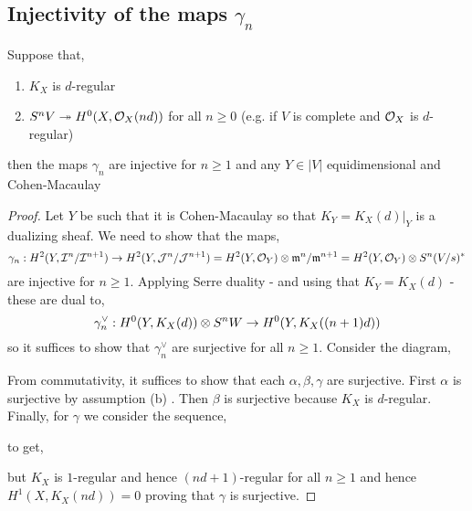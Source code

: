 \documentclass[12pt]{article}
\begin{document}
\subsection{Injectivity of the maps $\gamma_n$}

\begin{prop} \label{prop:injectivity}
Suppose that,
\begin{enumerate}
\item $K_X$ is $d$-regular
\item $S^n V \twoheadrightarrow H^0(X, \mathcal{O}_{X}(nd))$ for all $n \ge 0$ (e.g. if $V$ is complete and $\mathcal{O}_{X}$ is $d$-regular)
\end{enumerate}
then the maps $\gamma_n$ are injective for $n \ge 1$ and any $Y \in |V|$ equidimensional and Cohen-Macaulay
\end{prop}

\begin{proof}
Let $Y$ be such that it is Cohen-Macaulay so that $K_Y = K_X(d)|_Y$ is a dualizing sheaf.
We need to show that the maps,
\[ \gamma_n : H^2(Y, \mathcal{I}^n / \mathcal{I}^{n+1}) \to H^2(Y, \mathcal{J}^n / \mathcal{J}^{n+1}) = H^2(Y, \mathcal{O}_{Y}) \otimes \mathfrak{m}^n / \mathfrak{m}^{n+1} = H^2(Y, \mathcal{O}_{Y}) \otimes S^n (V/s)^* \]
are injective for $n \ge 1$.
Applying Serre duality - and using that $K_Y = K_X(d)$ - these are dual to,
\[ \gamma_n^\vee : H^0(Y, K_X(d)) \otimes S^n W \to H^0(Y, K_X((n+1)d)) \]
so it suffices to show that $\gamma_n^\vee$ are surjective for all $n \ge 1$.
Consider the diagram,
\begin{center}
\end{center}
From commutativity, it suffices to show that each $\alpha, \beta, \gamma$ are surjective. First $\alpha$ is surjective by assumption (b) . Then $\beta$ is surjective because $K_X$ is $d$-regular. Finally, for $\gamma$ we consider the sequence,
\begin{center}
\end{center} 
to get,
\begin{center}
\end{center}
but $K_X$ is $1$-regular and hence $(nd+1)$-regular for all $n \ge 1$ and hence $H^1(X, K_X(nd)) = 0$ proving that $\gamma$ is surjective.
\end{proof}
\end{document}
